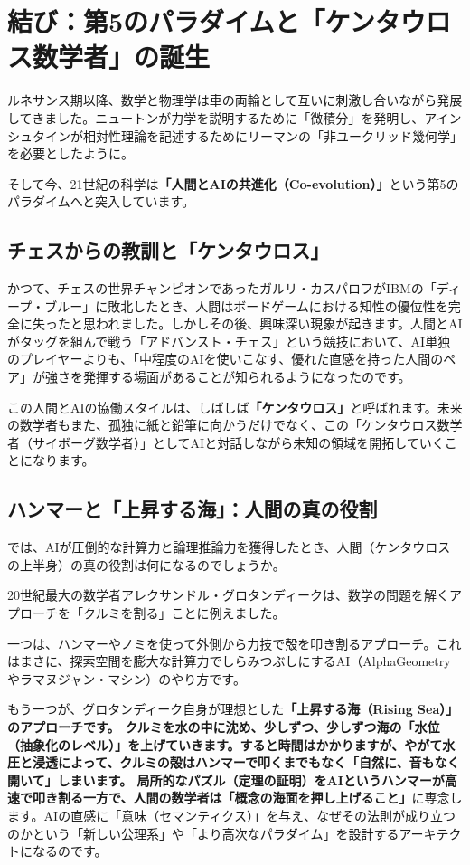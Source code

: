 \section{結び：第5のパラダイムと「ケンタウロス数学者」の誕生}

ルネサンス期以降、数学と物理学は車の両輪として互いに刺激し合いながら発展してきました。ニュートンが力学を説明するために「微積分」を発明し、アインシュタインが相対性理論を記述するためにリーマンの「非ユークリッド幾何学」を必要としたように。

そして今、21世紀の科学は\textbf{「人間とAIの共進化（Co-evolution）」}という第5のパラダイムへと突入しています。

\subsection{チェスからの教訓と「ケンタウロス」}

かつて、チェスの世界チャンピオンであったガルリ・カスパロフがIBMの「ディープ・ブルー」に敗北したとき、人間はボードゲームにおける知性の優位性を完全に失ったと思われました。しかしその後、興味深い現象が起きます。人間とAIがタッグを組んで戦う「アドバンスト・チェス」という競技において、AI単独のプレイヤーよりも、「中程度のAIを使いこなす、優れた直感を持った人間のペア」が強さを発揮する場面があることが知られるようになったのです。

この人間とAIの協働スタイルは、しばしば\textbf{「ケンタウロス」}と呼ばれます。未来の数学者もまた、孤独に紙と鉛筆に向かうだけでなく、この「ケンタウロス数学者（サイボーグ数学者）」としてAIと対話しながら未知の領域を開拓していくことになります。

\subsection{ハンマーと「上昇する海」：人間の真の役割}

では、AIが圧倒的な計算力と論理推論力を獲得したとき、人間（ケンタウロスの上半身）の真の役割は何になるのでしょうか。

20世紀最大の数学者アレクサンドル・グロタンディークは、数学の問題を解くアプローチを「クルミを割る」ことに例えました。

一つは、ハンマーやノミを使って外側から力技で殻を叩き割るアプローチ。これはまさに、探索空間を膨大な計算力でしらみつぶしにするAI（AlphaGeometryやラマヌジャン・マシン）のやり方です。

もう一つが、グロタンディーク自身が理想とした\textbf{「上昇する海（Rising Sea）」のアプローチです。 クルミを水の中に沈め、少しずつ、少しずつ海の「水位（抽象化のレベル）」を上げていきます。すると時間はかかりますが、やがて水圧と浸透によって、クルミの殻はハンマーで叩くまでもなく「自然に、音もなく開いて」しまいます。 局所的なパズル（定理の証明）をAIというハンマーが高速で叩き割る一方で、人間の数学者は「概念の海面を押し上げること」}に専念します。AIの直感に「意味（セマンティクス）」を与え、なぜその法則が成り立つのかという「新しい公理系」や「より高次なパラダイム」を設計するアーキテクトになるのです。

